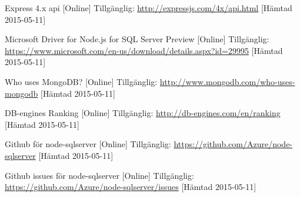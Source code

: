 \begin{thebibliography}{9}
Express 4.x api [Online] Tillgänglig: 
\url{http://expressjs.com/4x/api.html} [Hämtad 2015-05-11]

Microsoft Driver for Node.js for SQL Server Preview [Online] Tillgänglig: 
\url{https://www.microsoft.com/en-us/download/details.aspx?id=29995} [Hämtad 2015-05-11]

Who uses MongoDB? [Online] Tillgänglig: 
\url{http://www.mongodb.com/who-uses-mongodb} [Hämtad 2015-05-11]

DB-engines Ranking [Online] Tillgänglig: 
\url{http://db-engines.com/en/ranking} [Hämtad 2015-05-11]

Github för node-sqlserver [Online] Tillgänglig:  
\url{https://github.com/Azure/node-sqlserver} [Hämtad 2015-05-11]

Github issues för node-sqlserver [Online] Tillgänglig: 
\url{https://github.com/Azure/node-sqlserver/issues} [Hämtad 2015-05-11]

\end{thebibliography}
